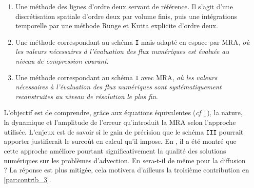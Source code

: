 \begin{enumerate}
    \renewcommand{\labelenumi}{\Roman{enumi}.}
    \item Une méthode des lignes d'ordre deux servant de référence. Il s'agit d'une discrétisation spatiale d'ordre deux par volume finis, 
    puis une intégrations temporelle par une méthode Runge et Kutta explicite d'ordre deux.
    \item Une méthode correspondant au schéma \texttt{I} mais adapté en espace par MRA, \emph{où les valeurs nécessaires à l'évaluation des flux numériques 
    est évaluée au niveau de compression courant}.
    \item Une méthode correspondant au schéma \texttt{I} avec MRA, \emph{où les valeurs nécessaires à l'évaluation des flux numériques 
    sont systématiquement reconstruites au niveau de résolution le plus fin}.
\end{enumerate}
L'objectif est de comprendre, grâce aux équations équivalentes (\emph{cf} \ref{}), la nature, la dynamique et l’amplitude de l'erreur qu'introduit la MRA selon l'approche utilisée.
L'enjeux est de savoir si le gain de précision que le schéma \texttt{III} pourrait apporter justifierait le surcoût en calcul qu'il impose.
En \cite{belloti_et_al_2025}, il a été montré que cette approche améliore pourtant significativement la qualité des solutions numériques sur les problèmes d'advection.
En sera-t-il de même pour la diffusion ? La réponse est plus mitigée, cela motivera d'ailleurs la troisième contribution en \ref{par:contrib_3}.